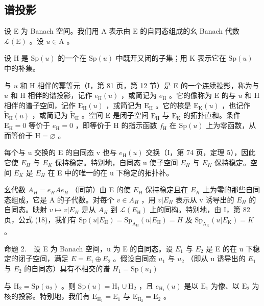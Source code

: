 \subsection{谱投影}

设 E 为 Banach 空间。我们用 A 表示由 E 的自同态组成的幺 Banach 代数 \(\mathcal{L}(\mathrm{E})\) 。设 \(u\in \mathrm{A}\) 。

设 H 是 \(\mathrm{Sp}(u)\) 的一个在 \(\mathrm{Sp}(u)\) 中既开又闭的子集；用 K 表示它在 \(\mathrm{Sp}(u)\) 中的补集。

与 \(u\) 和 H 相伴的幂等元（I，第 81 页，第 12 节）是 E 的一个连续投影，称为与 \(u\) 和 H 相伴的谱投影，记作 \(e_{\mathrm{H}}(u)\) ，或简记为 \(e_{\mathrm{H}}\) 。它的像称为 E 的与 \(u\) 和 H 相伴的谱子空间，记作 \(\mathrm{E_H}(u)\) ，或简记为 \(\mathrm{E_H}\) 。它的核是 \(\mathrm{E_K}(u)\) ，也记作 \(\widetilde{\mathrm{E}}_{\mathrm{H}}(u)\) ，或简记为 \(\widetilde{\mathrm{E}}_{\mathrm{H}}\) 。空间 E 是闭子空间 \(\mathrm{E_H}\) 与 \(\mathrm{E_K}\) 的拓扑直和。条件 \(\mathrm{E_H} = 0\) 等价于 \(e_{\mathrm{H}} = 0\) ，即等价于 H 的指示函数 \(f_{\mathrm{H}}\) 在 \(\mathrm{Sp}(u)\) 上为零函数，从而等价于 \(\mathrm{H} = \varnothing\) 。

每个与 u 交换的 E 的自同态 v 也与 \(e_{\mathrm{H}}(u)\) 交换（I，第 74 页，定理 5），因此它使 \(E_{H}\) 与 \(E_{K}\) 保持稳定。特别地，自同态 u 使子空间 \(E_{H}\) 与 \(E_{K}\) 保持稳定。空间 \(E_{K}\) 是 \(E_{H}\) 在 E 中的唯一的在 u 下稳定的拓扑补。

幺代数 \(A_{H} = e_{H}Ae_{H}\) （同前）由 E 的使 \(E_{H}\) 保持稳定且在 \(E_{K}\) 上为零的那些自同态组成，它是 A 的子代数。对每个 \(v \in A_{H}\) ，用 \(v|E_{H}\) 表示从 v 诱导出的 \(E_{H}\) 的自同态。映射 \(v \mapsto v|E_{H}\) 是从 \(A_{H}\) 到 \(\mathcal{L}(E_{\mathrm{H}})\) 上的同构。特别地，由 I，第 82 页，公式 (18)，我们有 \(\mathrm{Sp}(u|E_{\mathrm{H}}) = \mathrm{Sp}_{\mathrm{A}_{\mathrm{H}}} (u|E_{\mathrm{H}}) = H\) 及 \(\mathrm{Sp}_{\mathrm{A}_{\mathrm{K}}} (u|E_{\mathrm{K}}) = K\) 。

命题 2.　设 E 为 Banach 空间，u 为 E 的自同态。设 \(E_{1}\) 与 \(E_{2}\) 是 E 的在 u 下稳定的闭子空间，满足 \(E = E_{1} \oplus E_{2}\) 。假设自同态 \(u_{1}\) 与 \(u_{2}\) （即从 u 诱导出的 \(E_{1}\) 与 \(E_{2}\) 的自同态）具有不相交的谱 \(H_{1} = \mathrm{Sp}(u_{1})\)

与 \(\mathrm{H}_2 = \mathrm{Sp}(u_2)\) 。则 \(\mathrm{Sp}(u) = \mathrm{H}_1 \cup \mathrm{H}_2\) ，且 \(e_{\mathrm{H}_1}(u)\) 是以 \(\mathrm{E}_1\) 为像、以 \(\mathrm{E}_2\) 为核的投影。特别地，我们有 \(\mathrm{E}_{\mathrm{H}_1} = \mathrm{E}_1\) 与 \(\mathrm{E}_{\mathrm{H}_2} = \mathrm{E}_2\) 。

